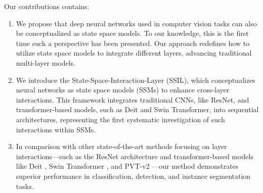 Our contributions contains:
\begin{enumerate}
    \item We propose that deep neural networks used in computer vision tasks can also be conceptualized as state space models. To our knowledge, this is the first time such a perspective has been presented. Our approach redefines how to utilize state space models to integrate different layers, advancing traditional multi-layer models.
    \item We introduce the State-Space-Interaction-Layer (SSIL), which conceptualizes neural networks as state space models (SSMs) to enhance cross-layer interactions. This framework integrates traditional CNNs, like ResNet, and transformer-based models, such as Deit and Swin Transformer, into sequential architectures, representing the first systematic investigation of such interactions within SSMs.
    \item In comparison with other state-of-the-art methods focusing on layer interactions—such as the ResNet \cite{he2016deep} architecture and transformer-based models like Deit \cite{touvron2021training}, Swin Transformer \cite{liu2021swin}, and PVT-v2 \cite{wang2022pvt}—our method demonstrates superior performance in classification, detection, and instance segmentation tasks.
\end{enumerate}
